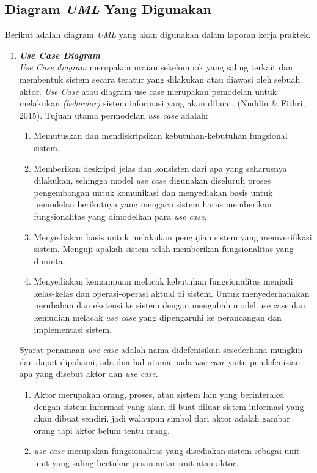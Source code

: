 \subsection{Diagram \textit{UML} Yang Digunakan}
Berikut adalah diagram \textit{UML} yang akan digunakan dalam laporan kerja praktek.
\begin{enumerate}
    \item \textbf{\textit{Use Case Diagram}}\\ \textit{Use Case diagram} merupakan uraian sekelompok yang saling terkait dan membentuk sistem secara teratur yang dilakukan atau diawasi oleh sebuah aktor. \textit{Use Case} atau diagram use case merupakan pemodelan untuk melakukan \textit{(behavior)} sistem informasi yang akan dibuat. (Nuddin \& Fithri, 2015). Tujuan utama permodelan \textit{use case} adalah:

\begin{enumerate} [label=\alph*.]
\item Memutuskan dan mendiskripsikan kebutuhan-kebutuhan fungsional sistem.
\item Memberikan deskripsi jelas dan konsisten dari apa yang seharusnya dilakukan, sehingga model \textit{use case} digunakan diseluruh proses pengembangan untuk komunikasi dan menyediakan basis untuk pemodelan berikutnya yang mengacu sistem harus memberikan fungsionalitas yang dimodelkan para \textit{use case}.
\item Menyediakan basis untuk melakukan pengujian sistem yang memverifikasi sistem. Menguji apakah sistem telah memberikan fungsionalitas yang diminta.
\item Menyediakan kemampuan melacak kebutuhan fungsionalitas menjadi kelas-kelas dan operasi-operasi aktual di sistem. Untuk menyederhanakan perubahan dan ekstensi ke sistem dengan mengubah model use case dan kemudian melacak \textit{use case} yang dipengaruhi ke perancangan dan implementasi sistem.
\end{enumerate}

\par Syarat penamaan \textit{use case} adalah nama didefenisikan sesederhana mungkin dan dapat dipahami, ada dua hal utama pada \textit{use case} yaitu pendefenisian apa yang disebut aktor dan \textit{use case}.

\begin{enumerate} [label=\alph*.]
\item Aktor merupakan orang, proses, atau sistem lain yang berinteraksi dengan sistem informasi yang akan di buat diluar sistem informasi yang akan dibuat sendiri, jadi walaupun simbol dari aktor adalah gambar orang tapi aktor belum tentu orang.
\item  \textit{use case} merupakan fungsionalitas yang disediakan sistem sebagai unit-unit yang saling bertukar pesan antar unit atau aktor.
\end{enumerate}


\end{enumerate}
